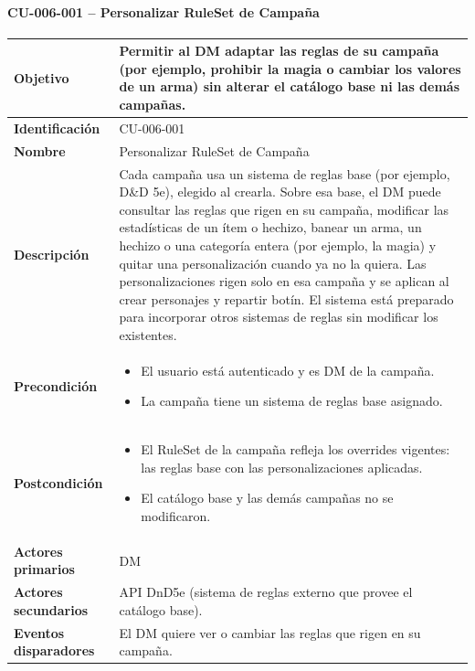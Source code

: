 \paragraph{CU-006-001 -- Personalizar RuleSet de Campaña}
{\small\setlength{\tabcolsep}{5pt}\renewcommand{\arraystretch}{1.2}
\begin{longtable}{|>{\raggedright\arraybackslash\bfseries}p{3.2cm}|>{\raggedright\arraybackslash}p{11.9cm}|}
\hline
Objetivo & Permitir al DM adaptar las reglas de su campaña (por ejemplo, prohibir la magia o cambiar los valores de un arma) sin alterar el catálogo base ni las demás campañas. \\ \hline
Identificación & CU-006-001 \\ \hline
Nombre & Personalizar RuleSet de Campaña \\ \hline
Descripción & Cada campaña usa un sistema de reglas base (por ejemplo, D\&D 5e), elegido al crearla. Sobre esa base, el DM puede consultar las reglas que rigen en su campaña, modificar las estadísticas de un ítem o hechizo, banear un arma, un hechizo o una categoría entera (por ejemplo, la magia) y quitar una personalización cuando ya no la quiera. Las personalizaciones rigen solo en esa campaña y se aplican al crear personajes y repartir botín. El sistema está preparado para incorporar otros sistemas de reglas sin modificar los existentes. \\ \hline
Precondición & \begin{itemize}[itemsep=2pt,topsep=2pt]
\item El usuario está autenticado y es DM de la campaña.
\item La campaña tiene un sistema de reglas base asignado.
\end{itemize} \\ \hline
Postcondición & \begin{itemize}[itemsep=2pt,topsep=2pt]
\item El RuleSet de la campaña refleja los overrides vigentes: las reglas base con las personalizaciones aplicadas.
\item El catálogo base y las demás campañas no se modificaron.
\end{itemize} \\ \hline
Actores primarios & DM \\ \hline
Actores secundarios & API DnD5e (sistema de reglas externo que provee el catálogo base). \\ \hline
Eventos disparadores & El DM quiere ver o cambiar las reglas que rigen en su campaña. \\ \hline

\end{longtable}}
